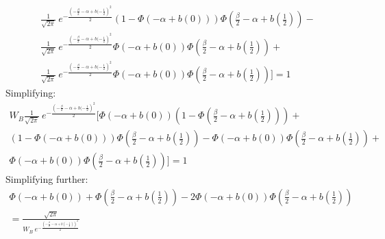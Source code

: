 \documentclass[12pt]{article}
\begin{document}
\begin{itemize}
\begin{itemize}
\begin{multline}
					\frac{1}{\sqrt{2\pi}} \: e^{- \frac{\left(-\frac{\beta}{2} - \alpha + b(-\frac{1}{2}\right)^2}{2}} \left(1-\Phi\left(- \alpha + b(0) \right)\right)\Phi\left(\frac{\beta}{2} - \alpha + b(\frac{1}{2}) \right) - \\
					\frac{1}{\sqrt{2\pi}} \: e^{- \frac{\left(-\frac{\beta}{2} - \alpha + b(-\frac{1}{2}\right)^2}{2}} \Phi\left(- \alpha + b(0) \right)\Phi\left(\frac{\beta}{2} - \alpha + b(\frac{1}{2}) \right) + \\
					\frac{1}{\sqrt{2\pi}} \: e^{- \frac{\left(-\frac{\beta}{2} - \alpha + b(-\frac{1}{2}\right)^2}{2}} \Phi\left(- \alpha + b(0) \right)\Phi\left(\frac{\beta}{2} - \alpha + b(\frac{1}{2}) \right) \biggr]  = 1
				\end{multline}
			Simplifying:
			\begin{multline}
					W_B \frac{1}{\sqrt{2\pi}} \: e^{- \frac{\left(-\frac{\beta}{2} - \alpha + b(-\frac{1}{2}\right)^2}{2}} \biggl[ \Phi\left(- \alpha + b(0) \right)\left(1-\Phi\left(\frac{\beta}{2} - \alpha + b(\frac{1}{2}) \right)\right)  + \\
					\left(1-\Phi\left(- \alpha + b(0) \right)\right)\Phi\left(\frac{\beta}{2} - \alpha + b(\frac{1}{2}) \right) - 
					\Phi\left(- \alpha + b(0) \right)\Phi\left(\frac{\beta}{2} - \alpha + b(\frac{1}{2}) \right) + \\
					\Phi\left(- \alpha + b(0) \right)\Phi\left(\frac{\beta}{2} - \alpha + b(\frac{1}{2}) \right) \biggr]  = 1
				\end{multline}
			Simplifying further:
			  \begin{multline}
					\Phi\left(- \alpha + b(0) \right)+ \Phi\left(\frac{\beta}{2} - \alpha + b(\frac{1}{2}) \right) 
					- 2\Phi\left(- \alpha + b(0) \right)\Phi\left(\frac{\beta}{2} - \alpha + b(\frac{1}{2}) \right) \\ = \frac{\sqrt{2\pi}}{W_B \: e^{- \frac{\left(-\frac{\beta}{2} - \alpha + b\left(-\frac{1}{2}\right)\right)^2}{2}} }
					\label{eq:firstfoc}
				\end{multline}
			

\end{itemize}
\end{itemize}
\end{document}
